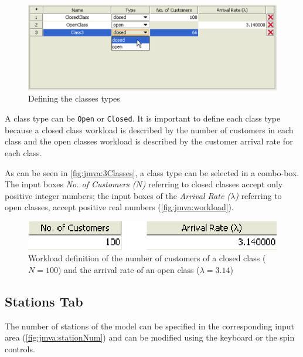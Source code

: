 \begin{figure}[htbp]
    \begin{center}
        \includegraphics[scale=.5]{img/jmva/3classes}
    \end{center}
    \caption{Defining the classes types}
    \label{fig:jmva:3Classes}
\end{figure}

A class type can be \texttt{Open} or \texttt{Closed}. It is
important to define each class type because a closed class workload
is described by the number of customers in each class and the open
classes workload is described by the customer arrival rate for each
class.

As can be seen in \autoref{fig:jmva:3Classes}, a class type can be
selected in a combo-box. The input boxes \emph{No. of Customers
($N$)} referring to closed classes accept only positive integer
numbers; the input boxes of the \emph{Arrival Rate ($\lambda$)}
referring to open classes, accept positive real numbers
(\autoref{fig:jmva:workload}).

\begin{figure}[htbp]
    \begin{center}
        \includegraphics[scale=.5]{img/jmva/NL}
    \end{center}
    \caption{Workload definition of the number of customers of a closed
    class ($N=100$) and the arrival rate of an open class ($\lambda=3.14$)}
    \label{fig:jmva:workload}
\end{figure}

\subsection{Stations Tab}
The number of stations of the model can be specified in the
corresponding input area (\autoref{fig:jmva:stationNum}) and can be
modified using the keyboard or the spin controls.

